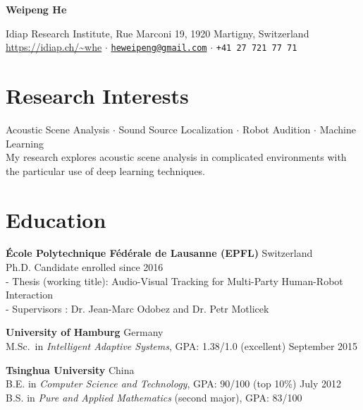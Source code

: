 \documentclass[a4paper,11pt]{article} %
\newcommand{\ind}{\hspace*{1em}}
\begin{document}
\thispagestyle{empty}


\begin{center}
  {\Huge\bfseries\sffamily Weipeng He}

  \sffamily Idiap Research Institute, Rue Marconi 19, 1920 Martigny, Switzerland \\
  \url{https://idiap.ch/~whe} $\cdotp$
  \href{mailto:heweipeng@gmail.com}{\texttt{heweipeng@gmail.com}} $\cdotp$
  \texttt{+41 27 721 77 71}
\end{center}


\section{Research Interests}
Acoustic Scene Analysis $\cdotp$ Sound Source Localization $\cdotp$ Robot Audition $\cdotp$ Machine Learning \\[.5em]
My research explores acoustic scene analysis in complicated environments with the particular use of deep learning techniques.


\section{Education}
\textbf{\'Ecole Polytechnique F\'ed\'erale de Lausanne (EPFL)} \hfill Switzerland \\
\ind Ph.D. Candidate \hfill enrolled since 2016 \\
\ind - Thesis (working title): Audio-Visual Tracking for Multi-Party Human-Robot Interaction \\
\ind - Supervisors : Dr. Jean-Marc Odobez and Dr. Petr Motlicek

\textbf{University of Hamburg} \hfill Germany \\
\ind M.Sc.\ in \textit{Intelligent Adaptive Systems}, GPA\@: 1.38/1.0 (excellent)  \hfill September 2015

\textbf{Tsinghua University} \hfill China \\
\ind B.E. in \textit{Computer Science and Technology}, GPA\@: 90/100 (top 10\%) \hfill July 2012 \\
\ind B.S. in \textit{Pure and Applied Mathematics} (second major), GPA\@: 83/100 %
\end{document}
